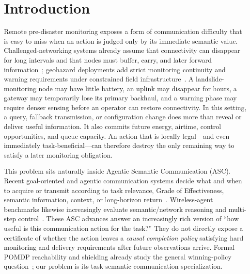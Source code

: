 \documentclass[conference]{IEEEtran}
\begin{document}
\section{Introduction}
Remote pre-disaster monitoring exposes a form of communication difficulty that is easy to miss when an action is judged only by its immediate semantic value. Challenged-networking systems already assume that connectivity can disappear for long intervals and that nodes must buffer, carry, and later forward information~\cite{fall2003dtn,jain2004dtnrouting,dtnarch,rfc9171}; geohazard deployments add strict monitoring continuity and warning requirements under constrained field infrastructure~\cite{sateriot,dzt0450,dzt0460}. A landslide-monitoring node may have little battery, an uplink may disappear for hours, a gateway may temporarily lose its primary backhaul, and a warning phase may require denser sensing before an operator can restore connectivity. In this setting, a query, fallback transmission, or configuration change does more than reveal or deliver useful information. It also commits future energy, airtime, control opportunities, and queue capacity. An action that is locally legal---and even immediately task-beneficial---can therefore destroy the only remaining way to satisfy a later monitoring obligation.

This problem sits naturally inside Agentic Semantic Communication (ASC). Recent goal-oriented and agentic communication systems decide what and when to acquire or transmit according to task relevance, Grade of Effectiveness, semantic information, context, or long-horizon return~\cite{agheli2025pull,wang2026wmcdt,saz2026logicalsemcom,zhao2026wirelesscontext}. Wireless-agent benchmarks likewise increasingly evaluate semantic/network reasoning and multi-step control~\cite{ferrag2026sixgbench,tong2026wirelessbench,ferrag2026alpha3bench}. These ASC advances answer an increasingly rich version of ``how useful is this communication action for the task?'' They do not directly expose a certificate of whether the action leaves a \emph{causal completion policy} satisfying hard monitoring and delivery requirements after future observations arrive. Formal POMDP reachability and shielding already study the general winning-policy question~\cite{junges2021reachability,ajdarow2023rsgoshield}; our problem is its task-semantic communication specialization.
\end{document}
